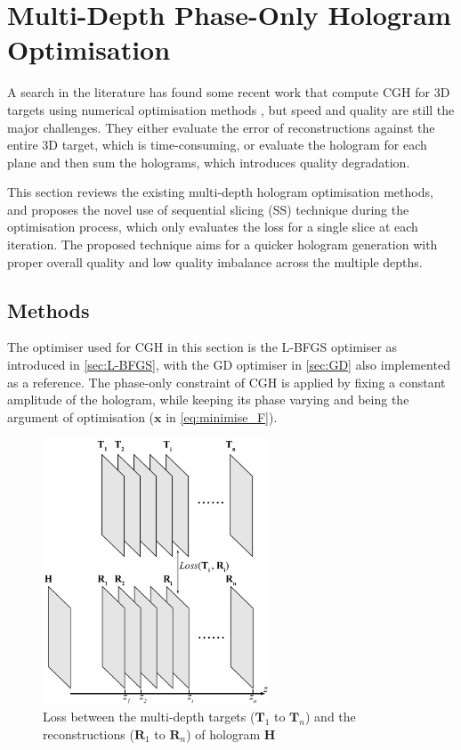 \newpage
\section{Multi-Depth Phase-Only Hologram Optimisation}\label{sec:Multi-Depth Phase-Only Hologram Optimisation}

A search in the literature has found some recent work that compute CGH for 3D targets using numerical optimisation methods \cite{Zhang2017, Liu2020, Choi2021, Chen2021}, but speed and quality are still the major challenges. They either evaluate the error of reconstructions against the entire 3D target, which is time-consuming, or evaluate the hologram for each plane and then sum the holograms, which introduces quality degradation.

This section reviews the existing multi-depth hologram optimisation methods, and proposes the novel use of sequential slicing (SS) technique during the optimisation process, which only evaluates the loss for a single slice at each iteration. The proposed technique aims for a quicker hologram generation with proper overall quality and low quality imbalance across the multiple depths.


\subsection{Methods}

The optimiser used for CGH in this section is the L-BFGS optimiser as introduced in \cref{sec:L-BFGS}, with the GD optimiser in \cref{sec:GD} also implemented as a reference. The phase-only constraint of CGH is applied by fixing a constant amplitude of the hologram, while keeping its phase varying and being the argument of optimisation ($\textbf{x}$ in \cref{eq:minimise_F}).

\begin{figure}[H]
	\centering
	\includegraphics[width=0.6\textwidth]{Fresnel_slice_illustration}
	\caption{Loss between the multi-depth targets ($\textbf{T}_1$ to $\textbf{T}_n$) and the reconstructions ($\textbf{R}_1$ to $\textbf{R}_n$) of hologram $\textbf{H}$}
	\label{fig:Fresnel_slice_illustration}
\end{figure}

